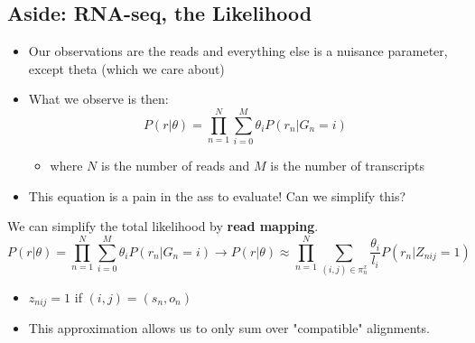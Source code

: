 \documentclass[10pt]{article}
\begin{document}
\subsection*{Aside: RNA-seq, the Likelihood}
\begin{itemize}
    \item Our observations are the reads and everything else is a nuisance parameter, except theta (which we care about)
    \item What we observe is then:
    \[P(r \vert \theta) = \prod_{n = 1}^N \sum_{i = 0}^M \theta_i P(r_n \vert G_n = i)\]
    \begin{itemize}
        \item where $N$ is the number of reads and $M$ is the number of transcripts
    \end{itemize}
    \item This equation is a pain in the ass to evaluate!  Can we simplify this?
\end{itemize}
We can simplify the total likelihood by \textbf{read mapping}.
\[P(r \vert \theta) = \prod_{n = 1}^N \sum_{i = 0}^M \theta_i P(r_n \vert G_n = i) \rightarrow P(r \vert \theta) \approx \prod_{n=1}^N \sum_{(i, j) \in \pi^x_n} \frac{\theta_i}{l_i} P(r_n \vert Z_{nij} = 1)\]
\begin{itemize}
    \item $z_{nij} = 1$ if $(i, j) = (s_n, o_n)$
    \item This approximation allows us to only sum over "compatible" alignments.
\end{itemize}
\end{document}
